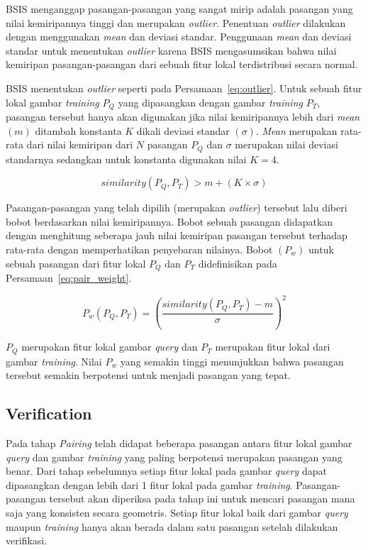 BSIS menganggap pasangan-pasangan yang sangat mirip adalah pasangan yang nilai kemiripannya tinggi dan merupakan \textit{outlier}. Penentuan \textit{outlier} dilakukan dengan menggunakan \textit{mean} dan deviasi standar. Penggunaan \textit{mean} dan deviasi standar untuk menentukan \textit{outlier} karena BSIS mengasumsikan bahwa nilai kemiripan pasangan-pasangan dari sebuah fitur lokal terdistribusi secara normal. 

BSIS menentukan \textit{outlier} seperti pada Persamaan~\ref{eq:outlier}. Untuk sebuah fitur lokal gambar \textit{training} $P_Q$ yang dipasangkan dengan gambar \textit{training} $P_T$, pasangan tersebut hanya akan digunakan jika nilai kemiripannya lebih dari \textit{mean} $(m)$ ditambah konstanta $K$ dikali deviasi standar $(\sigma)$. \textit{Mean} merupakan rata-rata dari nilai kemiripan dari $N$ pasangan $P_Q$ dan $\sigma$ merupakan nilai deviasi standarnya sedangkan untuk konstanta digunakan nilai $K=4$.

\vspace{-10px}
\begin{equation}
	\label{eq:outlier}
	similarity(P_Q, P_T) > m + (K \times \sigma)
\end{equation}

Pasangan-pasangan yang telah dipilih (merupakan \textit{outlier}) tersebut lalu diberi bobot berdasarkan nilai kemiripannya. Bobot sebuah pasangan didapatkan dengan menghitung seberapa jauh nilai kemiripan pasangan tersebut terhadap rata-rata dengan memperhatikan penyebaran nilainya. Bobot $(P_w)$ untuk sebuah pasangan dari fitur lokal $P_Q$ dan $P_T$ didefinisikan pada Persamaan~\ref{eq:pair_weight}.

\vspace{-7px}
\begin{equation}
	\label{eq:pair_weight}
	P_w(P_Q, P_T)=(\frac{similarity(P_Q, P_T) - m}{\sigma})^2
\end{equation}

$P_Q$ merupakan fitur lokal gambar \textit{query} dan $P_T$ merupakan fitur lokal dari gambar \textit{training}. Nilai $P_w$ yang semakin tinggi menunjukkan bahwa pasangan tersebut semakin berpotensi untuk menjadi pasangan yang tepat.

\subsection{Verification}
Pada tahap \textit{Pairing} telah didapat beberapa pasangan antara fitur lokal gambar \textit{query} dan gambar \textit{training} yang paling berpotensi merupakan pasangan yang benar. Dari tahap sebelumnya setiap fitur lokal pada gambar \textit{query} dapat dipasangkan dengan lebih dari 1 fitur lokal pada gambar \textit{training}. Pasangan-pasangan tersebut akan diperiksa pada tahap ini untuk mencari pasangan mana saja yang konsisten secara geometris. Setiap fitur lokal baik dari gambar \textit{query} maupun \textit{training} hanya akan berada dalam satu pasangan setelah dilakukan verifikasi.

